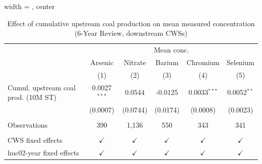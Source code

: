 
\begin{table}[htbp]
   
   \caption{\label{tab:6yr_huc02fe_inorg_val} Effect of cumulative upstream coal production on mean measured concentration (6-Year Review, downstream CWSs)}
   \bigskip
   
   \centering
   
   \begin{adjustbox}{width = \textwidth, center}
      
      
      \begin{tabular}{lccccc}
         \toprule
         
          & \multicolumn{5}{c}{Mean conc.}\\
         
                                             & Arsenic        & Nitrate       & Barium        & Chromium       & Selenium \\   
         
                                             & (1)            & (2)           & (3)           & (4)            & (5)\\  
         
         \midrule 
         Cumul. upstream coal prod. (10M ST) & 0.0027$^{***}$ & 0.0544        & -0.0125       & 0.0033$^{***}$ & 0.0052$^{**}$\\   
                                             & (0.0007)       & (0.0744)      & (0.0174)      & (0.0008)       & (0.0023)\\   
         
          \\
         
         Observations                        & 390            & 1,136         & 550           & 343            & 341\\  
         
          \\
         
         CWS fixed effects                   & $\checkmark$   & $\checkmark$  & $\checkmark$  & $\checkmark$   & $\checkmark$\\   
         huc02-year fixed effects            & $\checkmark$   & $\checkmark$  & $\checkmark$  & $\checkmark$   & $\checkmark$\\   
         
         \bottomrule
         
      \end{tabular}
      

\end{adjustbox}
\end{table}
